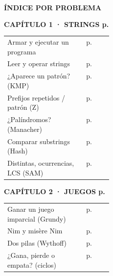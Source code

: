 \vspace{2mm}
{\sffamily\bfseries\small ÍNDICE POR PROBLEMA}\par\vspace{2pt}
\begin{minipage}[t]{0.325\linewidth}
{\sffamily\bfseries\footnotesize CAPÍTULO 1 · STRINGS
\hfill p.\,\pageref{sec:strings}}\par\vspace{1pt}
{\scriptsize
\begin{tabularx}{\linewidth}{@{}X>{\raggedleft\arraybackslash}p{0.25\linewidth}@{}}
Armar y ejecutar un programa & p.\,\pageref{rec:plantilla}\\
Leer y operar strings & p.\,\pageref{rec:stl}\\
¿Aparece un patrón? (KMP) & p.\,\pageref{rec:kmp}\\
Prefijos repetidos / patrón (Z) & p.\,\pageref{rec:z}\\
¿Palíndromos? (Manacher) & p.\,\pageref{rec:manacher}\\
Comparar substrings (Hash) & p.\,\pageref{rec:hash}\\
Distintas, ocurrencias, LCS (SAM) & p.\,\pageref{rec:sam}\\
\end{tabularx}}
\end{minipage}\hfill
\begin{minipage}[t]{0.325\linewidth}
{\sffamily\bfseries\footnotesize CAPÍTULO 2 · JUEGOS
\hfill p.\,\pageref{sec:juegos}}\par\vspace{1pt}
{\scriptsize
\begin{tabularx}{\linewidth}{@{}X>{\raggedleft\arraybackslash}p{0.25\linewidth}@{}}
Ganar un juego imparcial (Grundy) & p.\,\pageref{rec:grundy}\\
Nim y misère Nim & p.\,\pageref{rec:nim}\\
Dos pilas (Wythoff) & p.\,\pageref{rec:wythoff}\\
¿Gana, pierde o empata? (ciclos) & p.\,\pageref{rec:ciclos}\\
\end{tabularx}}
\end{minipage}\hfill
